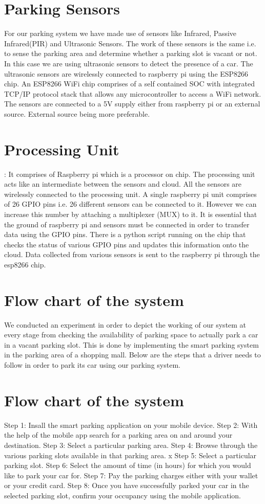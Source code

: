 \documentclass[conference]{IEEEtran}
\begin{document}
\section*{Parking Sensors}
For our parking system we have made use of sensors like Infrared, Passive Infrared(PIR) and Ultrasonic Sensors. The work of these sensors is the same i.e. to sense the parking area and determine whether a parking slot is vacant or not. In this case we are using ultrasonic sensors to detect the presence of a car. The ultrasonic sensors are wirelessly connected to raspberry pi using the ESP8266 chip. An ESP8266 WiFi chip comprises of a self contained SOC with integrated TCP/IP protocol stack that allows any microcontroller to access a WiFi network. The sensors are connected to a 5V supply either from raspberry pi or an external source. External source being more preferable. 

\section*{Processing Unit}
: It comprises of Raspberry pi which is a processor on chip. The processing unit acts like an intermediate between the sensors and cloud. All the sensors are wirelessly connected to the processing unit. A single raspberry pi unit comprises of 26 GPIO pins i.e. 26 different sensors can be connected to it. However we can increase this number by attaching a multiplexer (MUX) to it. It is essential that the ground of raspberry pi and sensors must be connected in order to transfer data using the GPIO pins. There is a python script running on the chip that checks the status of various GPIO pins and updates this information onto the cloud. Data collected from various sensors is sent to the raspberry pi through the esp8266 chip.
\section*{Flow chart of the system}
We conducted an experiment in order to depict the working of our system at every stage from checking the availability of parking space to actually park a car in a vacant parking slot. This is done by implementing the smart parking system in the parking area of a shopping mall. Below are the steps that a driver needs to follow in order to park its car using our parking system. 

\section*{Flow chart of the system}Step 1: Insall the smart parking application on your mobile device.  
Step 2: With the help of the mobile app search for a parking area on and around your destination.  
Step 3: Select a particular parking area.  
Step 4: Browse through the various parking slots available in that parking area. x 
Step 5: Select a particular parking slot.  
Step 6: Select the amount of time (in hours) for which you would like to park your car for.  
Step 7: Pay the parking charges either with your wallet or your credit card.  
Step 8: Once you have successfully parked your car in the selected parking slot, confirm your occupancy using the mobile application. 
\end{document}
